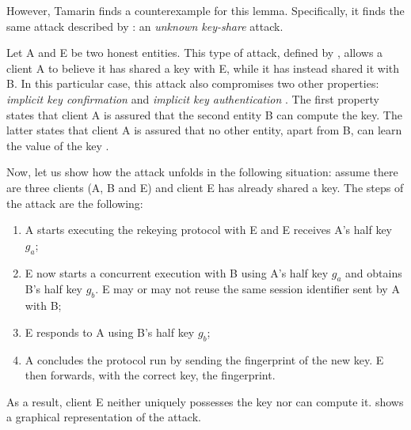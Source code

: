 However, Tamarin finds a counterexample for this lemma. Specifically, it finds the same attack described by \MMNV{}: an \textit{unknown key-share} attack.

Let A and E be two honest entities. This type of attack, defined by \SBWAM{} \cite{UKS}, allows a client A to believe it has shared a key with E, while it has instead shared it with B. In this particular case, this attack also compromises two other properties: \textit{implicit key confirmation} and \textit{implicit key authentication} \cite{MTProto2-Proverif}.
The first property states that client A is assured that the second entity B can compute the key. The latter states that client A is assured that no other entity, apart from B, can learn the value of the key \cite{UKS}.

Now, let us show how the attack unfolds in the following situation: assume there are three clients (A, B and E) and client E has already shared a \schat{} key. The steps of the attack are the following:

\begin{enumerate}
  \item A starts executing the rekeying protocol with E and E receives A's half key $g_a$;
  \item E now starts a concurrent execution with B using A's half key $g_a$ and obtains B's half key $g_b$. E may or may not reuse the same session identifier sent by A with B;
  \item E responds to A using B's half key $g_b$;
  \item A concludes the protocol run by sending the fingerprint of the new key. E then forwards, with the correct key, the fingerprint.
\end{enumerate}

As a result, client E neither uniquely possesses the key nor can compute it.  shows a graphical representation of the attack.

